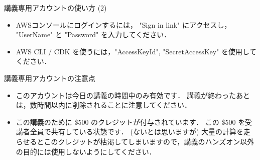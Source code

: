 \documentclass[unicode,11pt]{beamer}
\begin{document}
\begin{frame}{講義専用アカウントの使い方 (2)}

\begin{itemize}
    \item AWSコンソールにログインするには， "Sign in link" にアクセスし， "UserName" と "Password" を入力してください．
    \item AWS CLI / CDK を使うには，"AccessKeyId", "SecretAccessKey" を使用してください．
\end{itemize}
    
\end{frame}

\begin{frame}{講義専用アカウントの注意点}

\begin{itemize}
    \item このアカウントは今日の講義の時間中のみ有効です．
    講義が終わったあとは，数時間以内に削除されることに注意してください．
    \item この講義のために \$500 のクレジットが付与されています．
    この \$500 を受講者全員で共有している状態です．
    (ないとは思いますが) 大量の計算を走らせるとこのクレジットが枯渇してしまいますので，講義のハンズオン以外の目的には使用しないようにしてください．
\end{itemize}

\end{frame}
\end{document}
